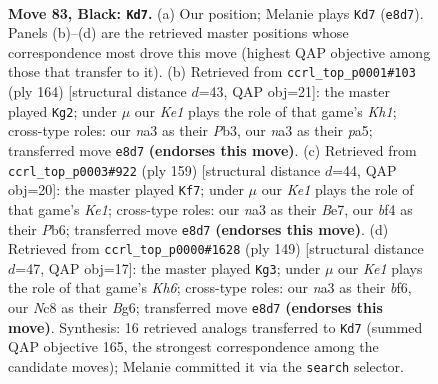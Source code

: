 \documentclass[11pt]{article}
\begin{document}
\clearpage

\begin{figure}[p]\centering
\begin{subfigure}{0.46\textwidth}\centering
\resizebox{\linewidth}{!}{%
\newchessgame
\chessboard[
  setfen={2n1k1K1/2P5/p7/P4p1p/4pBb1/N1r3P1/8/R7 b - - 73 83},
  showmover=false,
  pgfstyle=straightmove, color=movearrow, markmove={e8-d7}
]}
\caption{}
\end{subfigure}\hfill
\begin{subfigure}{0.46\textwidth}\centering
\resizebox{\linewidth}{!}{%
\newchessgame
\chessboard[
  setfen={5k2/2b5/5p2/pR3B1p/P3P2P/1Pr5/8/7K w - - 1 83},
  showmover=false,
  pgfstyle=straightmove, color=movearrow, markmove={h1-g2}
]}
\caption{}
\end{subfigure}
\\[4pt]
\begin{subfigure}{0.46\textwidth}\centering
\resizebox{\linewidth}{!}{%
\newchessgame
\chessboard[
  setfen={4k3/2R1b2p/1p5P/p3p1p1/P1P1P1K1/1r3B2/8/8 b - - 10 80},
  showmover=false,
  pgfstyle=straightmove, color=movearrow, markmove={e8-f7}
]}
\caption{}
\end{subfigure}\hfill
\begin{subfigure}{0.46\textwidth}\centering
\resizebox{\linewidth}{!}{%
\newchessgame
\chessboard[
  setfen={8/7p/2r2Bb1/1p4P1/p7/P6k/1KP2R2/8 b - - 57 75},
  showmover=false,
  pgfstyle=straightmove, color=movearrow, markmove={h3-g3}
]}
\caption{}
\end{subfigure}
\caption{\textbf{Move 83, Black: \texttt{Kd7}.} (a) Our position; Melanie plays \texttt{Kd7} (\texttt{e8d7}). Panels (b)--(d) are the retrieved master positions whose correspondence most drove this move (highest QAP objective among those that transfer to it). (b) Retrieved from \texttt{ccrl\_top\_p0001\#103} (ply 164) [structural distance $d$=43, QAP obj=21]: the master played \texttt{Kg2}; under $\mu$ our \emph{Ke1} plays the role of that game's \emph{Kh1}; cross-type roles: our \emph{n}a3 as their \emph{P}b3, our \emph{n}a3 as their \emph{p}a5; transferred move \texttt{e8d7} \textbf{(endorses this move)}. (c) Retrieved from \texttt{ccrl\_top\_p0003\#922} (ply 159) [structural distance $d$=44, QAP obj=20]: the master played \texttt{Kf7}; under $\mu$ our \emph{Ke1} plays the role of that game's \emph{Ke1}; cross-type roles: our \emph{n}a3 as their \emph{B}e7, our \emph{b}f4 as their \emph{P}b6; transferred move \texttt{e8d7} \textbf{(endorses this move)}. (d) Retrieved from \texttt{ccrl\_top\_p0000\#1628} (ply 149) [structural distance $d$=47, QAP obj=17]: the master played \texttt{Kg3}; under $\mu$ our \emph{Ke1} plays the role of that game's \emph{Kh6}; cross-type roles: our \emph{n}a3 as their \emph{b}f6, our \emph{N}c8 as their \emph{B}g6; transferred move \texttt{e8d7} \textbf{(endorses this move)}. Synthesis: 16 retrieved analogs transferred to \texttt{Kd7} (summed QAP objective 165, the strongest correspondence among the candidate moves); Melanie committed it via the \texttt{search} selector.}
\label{fig:thought-m165}
\end{figure}
\end{document}
